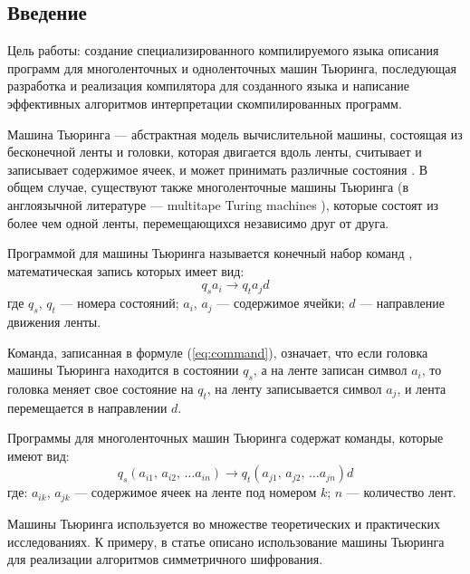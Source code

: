 \documentclass[10pt, normalheadings]{scrartcl}
\begin{document}
\begin{multicols}{2}
	
\section*{Введение}

Цель работы: создание специализированного компилируемого языка описания программ для многоленточных и одноленточных машин Тьюринга, последующая разработка и реализация компилятора для созданного языка и написание эффективных алгоритмов интерпретации скомпилированных программ.

Машина Тьюринга --- абстрактная модель вычислительной машины, состоящая из бесконечной ленты и головки, которая двигается вдоль ленты, считывает и записывает содержимое ячеек, и может принимать различные состояния \cite[с.~83]{Guts_Mathem_Logic}. В общем случае, существуют также многоленточные машины Тьюринга (в англоязычной литературе --- multitape Turing machines \cite[с.~126]{Rodger_JFLAP}), которые состоят из более чем одной ленты, перемещающихся независимо друг от друга.

Программой для машины Тьюринга называется конечный набор команд \cite[c.~84]{Guts_Mathem_Logic}, математическая запись которых имеет вид:
\begin{equation}\label{eq:command}
q_s a_i \rightarrow q_t a_j d
\end{equation}
где $q_s$, $q_t$ --- номера состояний; $a_i$, $a_j$ --- содержимое ячейки; $d$ --- направление движения ленты.

Команда, записанная в формуле (\ref{eq:command}), означает, что если головка машины Тьюринга находится в состоянии $q_s$, а на ленте записан символ $a_i$, то головка меняет свое состояние на $q_t$, на ленту записывается символ $a_j$, и лента перемещается в направлении $d$.

Программы для многоленточных машин Тьюринга содержат команды, которые имеют вид:
\begin{equation}\label{eq:command_2}
q_s \left( a_{i1},\,a_{i2},\,\ldots a_{in} \right) \rightarrow q_t \left( a_{j1},\,a_{j2},\,\ldots a_{jn} \right) d
\end{equation}
где: $a_{ik}$, $a_{jk}$ --- содержимое ячеек на ленте под номером $k$; $n$ --- количество лент.

Машины Тьюринга используется во множестве теоретических и практических исследованиях. К примеру, в статье \cite{Chernuchko_Crypto} описано использование машины Тьюринга для реализации алгоритмов симметричного шифрования.


\end{multicols}
\end{document}
